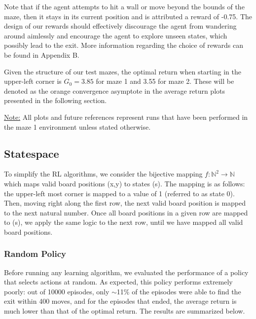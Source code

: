 \documentclass[final,12pt,3p]{elsarticle}
\begin{document}
Note that if the agent attempts to hit a wall or move beyond the bounds of the maze, then it stays in its current position and is attributed a reward of -0.75. The design of our rewards should effectively discourage the agent from wandering around aimlessly and encourage the agent to explore unseen states, which possibly lead to the exit. More information regarding the choice of rewards can be found in Appendix B. 

\par
Given the structure of our test mazes, the optimal return when starting in the upper-left corner is $G_0 = 3.85$ for maze 1 and 3.55 for maze 2. These will be denoted as the orange convergence asymptote in the average return plots presented in the following section.

\vskip 0.1in
\underline{Note:} All plots and future references represent runs that have been performed in the maze 1 environment unless stated otherwise.


\subsection{Statespace}
\vspace{12pt}

To simplify the RL algorithms, we consider the bijective mapping $f: \mathbb{N}^2 \rightarrow \mathbb{N}$ which maps valid board positions (x,y) to states (s). The mapping is as follows: the upper-left most corner is mapped to a value of 1 (referred to as state 0). Then, moving right along the first row, the next valid board position is mapped to the next natural number. Once all board positions in a given row are mapped to (s), we apply the same logic to the next row, until we have mapped all valid board positions. 

\vspace{12pt}
\subsubsection{Random Policy}
\vspace{12pt}

Before running any learning algorithm, we evaluated the performance of a policy that selects actions at random. As expected, this policy performs extremely poorly: out of 10000 episodes, only $\sim$11\% of the episodes were able to find the exit within 400 moves, and for the episodes that ended, the average return is much lower than that of the optimal return. The results are summarized below.
\end{document}
